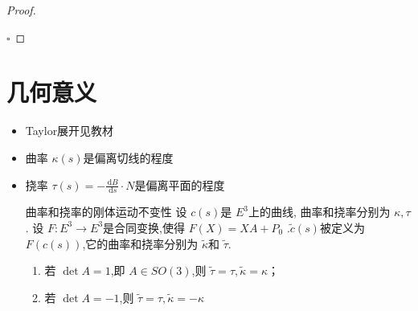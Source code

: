 \documentclass[../../古典微分几何.tex]{subfiles}
\begin{document}
\begin{proof}
\begin{itemize}
    \end{itemize}
    

    \hfill $\square$
\end{proof}


\section{几何意义}

\begin{itemize}
    \item Taylor展开见教材
    \item 曲率 \(   \kappa  \left( s \right)   \)是偏离切线的程度
    \item 挠率 \(  \tau \left( s \right)= - \frac{\,\mathrm{d} B }{\,\mathrm{d} s }\cdot N    \)是偏离平面的程度  
    

    \begin{lemma}{曲率和挠率的刚体运动不变性}
        设 \(  c\left( s \right)   \)是 \(  E^{3}  \)上的曲线, 曲率和挠率分别为 \(   \kappa ,\tau   \).   
        设 \(  F: E^{3}\to E^{3}  \)是合同变换,使得 \(  F\left( X \right)= XA+ P_0   \)  .\(  \tilde{c}\left( s \right)   \)被定义为 \(  F\left( c\left( s \right)  \right)   \),它的曲率和挠率分别为 \(   \tilde{\kappa}   \)和 \(  \tilde{\tau}   \).
        \begin{enumerate}
            \item 若 \(  \det A = 1  \),即 \(  A \in SO\left( 3 \right)   \),则 \(  \tilde{\tau} = \tau , \tilde{\kappa} =  \kappa   \)；
            \item 若 \(  \det A = -1  \),则  \(  \tilde{\tau} = \tau , \tilde{\kappa} = - \kappa   \)     
        \end{enumerate}
            

\end{lemma}
\end{itemize}
\end{document}
